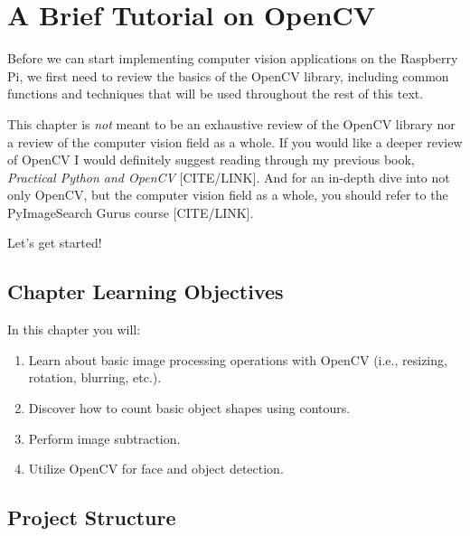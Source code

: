 \chapter{A Brief Tutorial on OpenCV}\label{ch:hobbyist:opencv_basics}

Before we can start implementing computer vision applications on the Raspberry Pi, we first need to review the basics of the OpenCV library, including common functions and techniques that will be used throughout the rest of this text.

This chapter is \textit{not} meant to be an exhaustive review of the OpenCV library nor a review of the computer vision field as a whole. If you would like a deeper review of OpenCV I would definitely suggest reading through my previous book, \textit{Practical Python and OpenCV} [CITE/LINK]. And for an in-depth dive into not only OpenCV, but the computer vision field as a whole, you should refer to the PyImageSearch Gurus course [CITE/LINK].

Let’s get started!


\section{Chapter Learning Objectives}

In this chapter you will:

\begin{enumerate}
    \item Learn about basic image processing operations with OpenCV (i.e., resizing, rotation, blurring, etc.).
    \item Discover how to count basic object shapes using contours.
    \item Perform image subtraction.
    \item Utilize OpenCV for face and object detection.
\end{enumerate}

\section{Project Structure}


